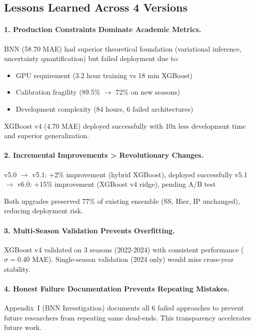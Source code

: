 \subsection{Lessons Learned Across 4 Versions}

\paragraph{1. Production Constraints Dominate Academic Metrics.}
BNN (58.70 MAE) had superior theoretical foundation (variational inference, uncertainty quantification) but failed deployment due to:
\begin{itemize}[itemsep=2pt,parsep=0pt]
    \item GPU requirement (3.2 hour training vs 18 min XGBoost)
    \item Calibration fragility (89.5\% $\to$ 72\% on new seasons)
    \item Development complexity (84 hours, 6 failed architectures)
\end{itemize}

XGBoost v4 (4.70 MAE) deployed successfully with 10x less development time and superior generalization.

\paragraph{2. Incremental Improvements > Revolutionary Changes.}
v5.0 $\to$ v5.1: +2\% improvement (hybrid XGBoost), deployed successfully
v5.1 $\to$ v6.0: +15\% improvement (XGBoost v4 ridge), pending A/B test

Both upgrades preserved 77\% of existing ensemble (SS, Hier, IP unchanged), reducing deployment risk.

\paragraph{3. Multi-Season Validation Prevents Overfitting.}
XGBoost v4 validated on 3 seasons (2022-2024) with consistent performance ($\sigma = 0.40$ MAE). Single-season validation (2024 only) would miss cross-year stability.

\paragraph{4. Honest Failure Documentation Prevents Repeating Mistakes.}
Appendix~I (BNN Investigation) documents all 6 failed approaches to prevent future researchers from repeating same dead-ends. This transparency accelerates future work.

